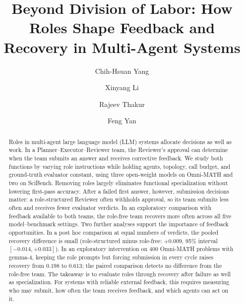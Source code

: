 \documentclass[sigconf,nonacm,balance=false]{aamas}
\begin{document}
\title{Beyond Division of Labor: How Roles Shape Feedback and Recovery in Multi-Agent Systems}

\author{Chih-Hsuan Yang}

\author{Xinyang Li}
\authornotemark[1]
\author{Rajeev Thakur}
\author{Feng Yan}

\begin{abstract}
Roles in multi-agent large language model (LLM) systems allocate decisions as well as work. In a Planner--Executor--Reviewer team, the Reviewer's approval can determine when the team submits an answer and receives corrective feedback. We study both functions by varying role instructions while holding agents, topology, call budget, and ground-truth evaluator constant, using three open-weight models on Omni-MATH and two on SciBench. Removing roles largely eliminates functional specialization without lowering first-pass accuracy. After a failed first answer, however, submission decisions matter: a role-structured Reviewer often withholds approval, so its team submits less often and receives fewer evaluator verdicts. In an exploratory comparison with feedback available to both teams, the role-free team recovers more often across all five model--benchmark settings. Two further analyses support the importance of feedback opportunities. In a post hoc comparison at equal numbers of verdicts, the pooled recovery difference is small (role-structured minus role-free: $+0.009$, 95\% interval $[-0.014,+0.033]$). In an exploratory intervention on $400$ Omni-MATH problems with gemma-4, keeping the role prompts but forcing submission in every cycle raises recovery from $0.198$ to $0.613$; the paired comparison detects no difference from the role-free team. The takeaway is to evaluate roles through recovery after failure as well as specialization. For systems with reliable external feedback, this requires measuring who may submit, how often the team receives feedback, and which agents can act on it.
\end{abstract}
\end{document}

